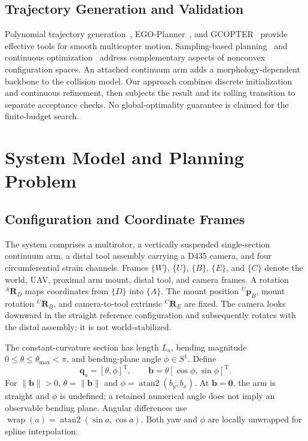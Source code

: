 \documentclass[journal,twoside]{IEEEtran}
\newcommand{\wrap}{\operatorname{wrap}}
\begin{document}
\subsection{Trajectory Generation and Validation}
Polynomial trajectory generation~\cite{mellinger2011minsnap}, EGO-Planner~\cite{zhou2021egoplanner}, and GCOPTER~\cite{wang2022gcopter} provide effective tools for smooth multicopter motion. Sampling-based planning~\cite{karaman2011sampling,meng2022rrtstar} and continuous optimization~\cite{schulman2014trajopt} address complementary aspects of nonconvex configuration spaces. An attached continuum arm adds a morphology-dependent backbone to the collision model. Our approach combines discrete initialization and continuous refinement, then subjects the result and its rolling transition to separate acceptance checks. No global-optimality guarantee is claimed for the finite-budget search.

\section{System Model and Planning Problem}\label{sec:model}
\subsection{Configuration and Coordinate Frames}
The system comprises a multirotor, a vertically suspended single-section continuum arm, a distal tool assembly carrying a D435 camera, and four circumferential strain channels. Frames $\{W\}$, $\{U\}$, $\{B\}$, $\{E\}$, and $\{C\}$ denote the world, UAV, proximal arm mount, distal tool, and camera frames. A rotation ${}^{A}\mathbf R_D$ maps coordinates from $\{D\}$ into $\{A\}$. The mount position ${}^{U}\mathbf p_B$, mount rotation ${}^{U}\mathbf R_B$, and camera-to-tool extrinsic ${}^{C}\mathbf R_E$ are fixed. The camera looks downward in the straight reference configuration and subsequently rotates with the distal assembly; it is not world-stabilized.

The constant-curvature section has length $L_a$, bending magnitude $0\le\theta\le\theta_{\max}<\pi$, and bending-plane angle $\phi\in S^1$. Define
\begin{equation}
\mathbf q_a=[\theta,\phi]^{\mathrm T},\qquad
\mathbf b=\theta[\cos\phi,\sin\phi]^{\mathrm T}.
\label{eq:morphology_state}
\end{equation}
For $\|\mathbf b\|>0$, $\theta=\|\mathbf b\|$ and $\phi=\operatorname{atan2}(b_y,b_x)$. At $\mathbf b=\mathbf0$, the arm is straight and $\phi$ is undefined; a retained numerical angle does not imply an observable bending plane. Angular differences use $\wrap(a)=\operatorname{atan2}(\sin a,\cos a)$. Both yaw and $\phi$ are locally unwrapped for spline interpolation.
\end{document}
